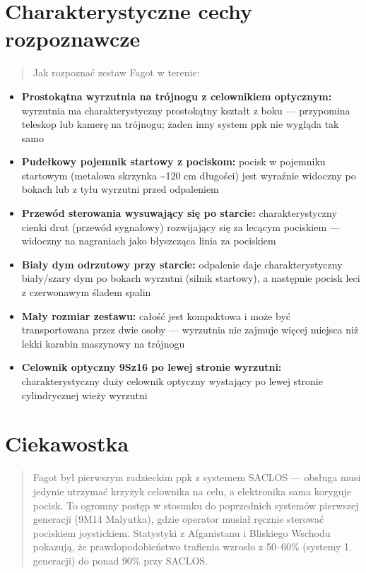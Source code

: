 \documentclass[12pt,openany,oneside]{book}
\providecommand{\tightlist}{%
  \setlength{\itemsep}{0pt}\setlength{\parskip}{0pt}}
\begin{document}
\section{Charakterystyczne cechy
rozpoznawcze}\label{charakterystyczne-cechy-rozpoznawcze-34}

\begin{quote}
Jak rozpoznać zestaw Fagot w terenie:
\end{quote}

\begin{itemize}
\tightlist
\item
  \textbf{Prostokątna wyrzutnia na trójnogu z celownikiem optycznym:}
  wyrzutnia ma charakterystyczny prostokątny kształt z boku ---
  przypomina teleskop lub kamerę na trójnogu; żaden inny system ppk nie
  wygląda tak samo
\item
  \textbf{Pudełkowy pojemnik startowy z pociskom:} pocisk w pojemniku
  startowym (metalowa skrzynka \textasciitilde120 cm długości) jest
  wyraźnie widoczny po bokach lub z tyłu wyrzutni przed odpaleniem
\item
  \textbf{Przewód sterowania wysuwający się po starcie:}
  charakterystyczny cienki drut (przewód sygnałowy) rozwijający się za
  lecącym pociskiem --- widoczny na nagraniach jako błyszcząca linia za
  pociskiem
\item
  \textbf{Biały dym odrzutowy przy starcie:} odpalenie daje
  charakterystyczny biały/szary dym po bokach wyrzutni (silnik
  startowy), a następnie pocisk leci z czerwonawym śladem spalin
\item
  \textbf{Mały rozmiar zestawu:} całość jest kompaktowa i może być
  transportowana przez dwie osoby --- wyrzutnia nie zajmuje więcej
  miejsca niż lekki karabin maszynowy na trójnogu
\item
  \textbf{Celownik optyczny 9Sz16 po lewej stronie wyrzutni:}
  charakterystyczny duży celownik optyczny wystający po lewej stronie
  cylindrycznej wieży wyrzutni
\end{itemize}

\section{Ciekawostka}\label{ciekawostka-34}

\begin{quote}
Fagot był pierwszym radzieckim ppk z systemem SACLOS --- obsługa musi
jedynie utrzymać krzyżyk celownika na celu, a elektronika sama koryguje
pocisk. To ogromny postęp w stosunku do poprzednich systemów pierwszej
generacji (9M14 Malyutka), gdzie operator musiał ręcznie sterować
pociskiem joystickiem. Statystyki z Afganistanu i Bliskiego Wschodu
pokazują, że prawdopodobieństwo trafienia wzrosło z 50--60\% (systemy 1.
generacji) do ponad 90\% przy SACLOS.
\end{quote}
\end{document}
